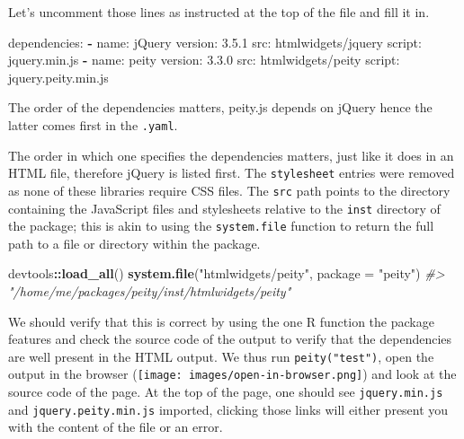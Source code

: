 \documentclass[10pt,]{krantz}
\makeatletter
\newenvironment{Shaded}{\begin{snugshade}}{\end{snugshade}}
\newcommand{\AttributeTok}[1]{\textcolor[rgb]{0.61,0.61,0.61}{#1}}
\newcommand{\CommentTok}[1]{\textcolor[rgb]{0.37,0.37,0.37}{\textit{#1}}}
\newcommand{\DataTypeTok}[1]{\textcolor[rgb]{0.27,0.27,0.27}{#1}}
\newcommand{\FloatTok}[1]{\textcolor[rgb]{0.06,0.06,0.06}{#1}}
\newcommand{\FunctionTok}[1]{\textcolor[rgb]{0,0,0}{#1}}
\newcommand{\KeywordTok}[1]{\textcolor[rgb]{0.27,0.27,0.27}{\textbf{#1}}}
\newcommand{\NormalTok}[1]{#1}
\newcommand{\OperatorTok}[1]{\textcolor[rgb]{0.43,0.43,0.43}{\textbf{#1}}}
\newcommand{\StringTok}[1]{\textcolor[rgb]{0.5,0.5,0.5}{#1}}
\newenvironment{kframe}{%
\medskip{}
\setlength{\fboxsep}{.8em}
 \def\at@end@of@kframe{}%
 \ifinner\ifhmode%
  \def\at@end@of@kframe{\end{minipage}}%
  \begin{minipage}{\columnwidth}%
 \fi\fi%
 \def\FrameCommand##1{\hskip\@totalleftmargin \hskip-\fboxsep
 \colorbox{shadecolor}{##1}\hskip-\fboxsep
     \hskip-\linewidth \hskip-\@totalleftmargin \hskip\columnwidth}%
 \MakeFramed {\advance\hsize-\width
   \@totalleftmargin\z@ \linewidth\hsize
   \@setminipage}}%
 {\par\unskip\endMakeFramed%
 \at@end@of@kframe}
\renewenvironment{Shaded}{\begin{kframe}}{\end{kframe}}
\newenvironment{rmdblock}[1]
  {
  \begin{itemize}
  \renewcommand{\labelitemi}{
    \raisebox{-.7\height}[0pt][0pt]{
      {\setkeys{Gin}{width=3em,keepaspectratio}\texttt{[image: images/\#1]}}
    }
  }
  \setlength{\fboxsep}{1em}
  \begin{kframe}
  \item
  }
  {
  \end{kframe}
  \end{itemize}
  }
\newenvironment{rmdnote}
  {\begin{rmdblock}{note}}
  {\end{rmdblock}}
\makeatother
\begin{document}
Let's uncomment those lines as instructed at the top of the file and fill it in.

\begin{Shaded}
\begin{Highlighting}[]
\FunctionTok{dependencies:}
  \KeywordTok{-} \FunctionTok{name:}\AttributeTok{ jQuery}
    \FunctionTok{version:}\AttributeTok{ }\FloatTok{3.5.1}
    \FunctionTok{src:}\AttributeTok{ htmlwidgets/jquery}
    \FunctionTok{script:}\AttributeTok{ jquery.min.js}
  \KeywordTok{-} \FunctionTok{name:}\AttributeTok{ peity}
    \FunctionTok{version:}\AttributeTok{ }\FloatTok{3.3.0}
    \FunctionTok{src:}\AttributeTok{ htmlwidgets/peity}
    \FunctionTok{script:}\AttributeTok{ jquery.peity.min.js}
\end{Highlighting}
\end{Shaded}

\begin{rmdnote}
The order of the dependencies matters, peity.js depends on jQuery hence
the latter comes first in the \texttt{.yaml}.
\end{rmdnote}

The order in which one specifies the dependencies matters, just like it does in an HTML file, therefore jQuery is listed first. The \texttt{stylesheet} entries were removed as none of these libraries require CSS files. The \texttt{src} path points to the directory containing the JavaScript files and stylesheets relative to the \texttt{inst} directory of the package; this is akin to using the \texttt{system.file} function to return the full path to a file or directory within the package.

\begin{Shaded}
\begin{Highlighting}[]
\NormalTok{devtools}\OperatorTok{::}\KeywordTok{load_all}\NormalTok{()}
\KeywordTok{system.file}\NormalTok{(}\StringTok{"htmlwidgets/peity"}\NormalTok{, }\DataTypeTok{package =} \StringTok{"peity"}\NormalTok{)                                         }
\CommentTok{#> "/home/me/packages/peity/inst/htmlwidgets/peity"}
\end{Highlighting}
\end{Shaded}

We should verify that this is correct by using the one R function the package features and check the source code of the output to verify that the dependencies are well present in the HTML output. We thus run \texttt{peity("test")}, open the output in the browser (\texttt{[image: images/open-in-browser.png]}) and look at the source code of the page. At the top of the page, one should see \texttt{jquery.min.js} and \texttt{jquery.peity.min.js} imported, clicking those links will either present you with the content of the file or an error.
\end{document}
